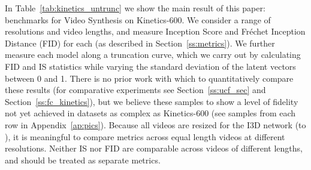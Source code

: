 \documentclass{article} \usepackage{iclr2020_conference,times}
\begin{document}
\begin{figure}[h]
\CenterFloatBoxes
\begin{floatrow}
\end{floatrow}
\end{figure}

In Table~\ref{tab:kinetics_untrunc} we show the main result of this paper: benchmarks for Video Synthesis on Kinetics-600. We consider a range of resolutions and video lengths, and measure Inception Score and Fr\'echet Inception Distance (FID) for each (as described in Section~\ref{ss:metrics}). We further measure each model along a truncation curve, which we carry out by calculating FID and IS statistics while varying the standard deviation of the latent vectors between 0 and 1. There is no prior work with which to quantitatively compare these results (for comparative experiments see Section~\ref{ss:ucf_sec} and Section~\ref{ss:fc_kinetics}), but we believe these samples to show a level of fidelity not yet achieved in datasets as complex as Kinetics-600 (see samples from each row in Appendix~\ref{ap:pics}). Because all videos are resized for the I3D network (to ), it is meaningful to compare metrics across equal length videos at different resolutions. Neither IS nor FID are comparable across videos of different lengths, and should be treated as separate metrics.
\end{document}
